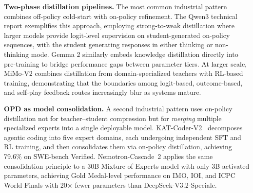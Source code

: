\documentclass{article} %
\begin{document}
\textbf{Two-phase distillation pipelines.}
The most common industrial pattern combines off-policy cold-start with on-policy refinement. The Qwen3 technical report \citep{2505.09388} exemplifies this approach, employing strong-to-weak distillation where larger models provide logit-level supervision on student-generated on-policy sequences, with the student generating responses in either thinking or non-thinking mode. Gemma 2 \citep{2408.00118} similarly embeds knowledge distillation directly into pre-training to bridge performance gaps between parameter tiers. At larger scale, MiMo-V2 \citep{2601.02780} combines distillation from domain-specialized teachers with RL-based training, demonstrating that the boundaries among logit-based, outcome-based, and self-play feedback routes increasingly blur as systems mature.

\textbf{OPD as model consolidation.}
A second industrial pattern uses on-policy distillation not for teacher--student compression but for \emph{merging} multiple specialized experts into a single deployable model. KAT-Coder-V2~\citep{li2026katcoderv2} decomposes agentic coding into five expert domains, each undergoing independent SFT and RL training, and then consolidates them via on-policy distillation, achieving 79.6\% on SWE-bench Verified. Nemotron-Cascade~2 \citep{2603.19220} applies the same consolidation principle to a 30B Mixture-of-Experts model with only 3B activated parameters, achieving Gold Medal-level performance on IMO, IOI, and ICPC World Finals with 20$\times$ fewer parameters than DeepSeek-V3.2-Speciale.
\end{document}
